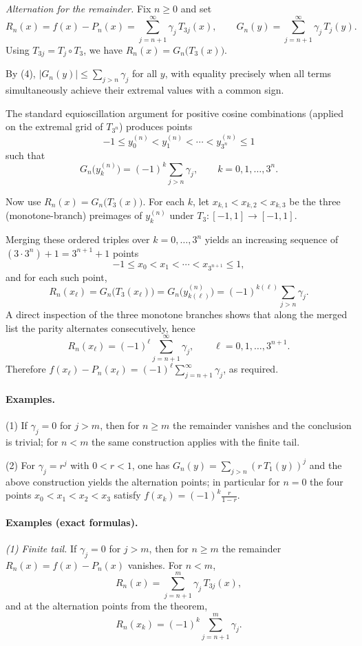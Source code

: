 \documentclass[12pt,a4paper]{article}
\theoremstyle{plain}
\theoremstyle{definition}
\theoremstyle{remark}
\theoremstyle{remark}
\begin{document}
\smallskip
\emph{Alternation for the remainder.}
Fix $n\ge 0$ and set
\[
R_n(x)=f(x)-P_n(x)=\sum_{j=n+1}^{\infty}\gamma_j\,T_{3j}(x),\qquad
G_n(y)=\sum_{j=n+1}^{\infty}\gamma_j\,T_j(y).
\]
Using $T_{3j}=T_j\circ T_3$, we have $R_n(x)=G_n\!\big(T_3(x)\big)$.

By (4), $|G_n(y)|\le \sum_{j>n}\gamma_j$ for all $y$, with equality precisely when all
terms simultaneously achieve their extremal values with a common sign.

 The standard
equioscillation argument for positive cosine combinations (applied on the extremal grid of
$T_{3^n}$) produces points
\[
-1\le y^{(n)}_0<y^{(n)}_1<\cdots<y^{(n)}_{3^n}\le 1
\]
such that
\[
G_n\!\big(y^{(n)}_k\big)=(-1)^k\sum_{j>n}\gamma_j,\qquad k=0,1,\dots,3^n.
\]

Now use $R_n(x)=G_n\!\big(T_3(x)\big)$.
 For each $k$, let
$x_{k,1}<x_{k,2}<x_{k,3}$ be the three (monotone-branch) preimages of $y^{(n)}_k$ under
$T_3:[-1,1]\to[-1,1]$.

 Merging these ordered triples over $k=0,\dots,3^n$ yields an
increasing sequence of $(3\cdot 3^n)+1=3^{n+1}+1$ points
\[
-1\le x_0<x_1<\cdots<x_{3^{n+1}}\le 1,
\]
and for each such point,
\[
R_n(x_\ell)=G_n\big(T_3(x_\ell)\big)=G_n\!\big(y^{(n)}_{k(\ell)}\big)
= (-1)^{k(\ell)}\sum_{j>n}\gamma_j.
\]
A direct inspection of the three monotone branches shows that along the merged list the
parity alternates consecutively, hence
\[
R_n(x_\ell)=(-1)^\ell\sum_{j=n+1}^{\infty}\gamma_j,\qquad \ell=0,1,\dots,3^{n+1}.
\]
Therefore $f(x_\ell)-P_n(x_\ell)=(-1)^\ell\sum_{j=n+1}^{\infty}\gamma_j$, as required.

\paragraph{Examples.}
(1) If $\gamma_j=0$ for $j>m$, then for $n\ge m$ the remainder vanishes and the conclusion is
trivial; for $n<m$ the same construction applies with the finite tail.


(2) For $\gamma_j=r^j$ with $0<r<1$, one has $G_n(y)=\sum_{j>n}(r\,T_1(y))^j$ and the above
construction yields the alternation points; in particular for $n=0$ the four points
$x_0<x_1<x_2<x_3$ satisfy $f(x_k)=(-1)^k\frac{r}{1-r}$.


\paragraph{Examples (exact formulas).}

\emph{(1) Finite tail.}
If $\gamma_j=0$ for $j>m$, then for $n\ge m$ the remainder
$R_n(x)=f(x)-P_n(x)$ vanishes.
For $n<m$,
\[
R_n(x)=\sum_{j=n+1}^{m}\gamma_j\,T_{3j}(x),
\]
and at the alternation points from the theorem,
\[
R_n(x_k)=(-1)^k\sum_{j=n+1}^{m}\gamma_j .
\]
\end{document}
